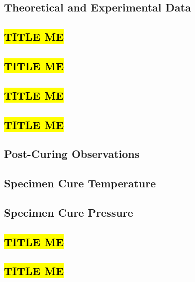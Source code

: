 \subsection{Theoretical and Experimental Data}


\clearpage
\subsection{\hl{TITLE ME}}


\subsection{\hl{TITLE ME}}


\subsection{\hl{TITLE ME}}


\subsection{\hl{TITLE ME}}


\clearpage
\subsection{Post-Curing Observations}


\subsection{Specimen Cure Temperature}


\subsection{Specimen Cure Pressure}


\clearpage
\subsection{\hl{TITLE ME}}


\subsection{\hl{TITLE ME}}


